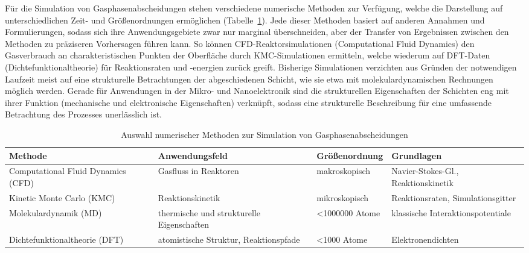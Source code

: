 Für die Simulation von Gasphasenabscheidungen stehen verschiedene numerische Methoden zur Verfügung, welche die Darstellung auf unterschiedlichen Zeit- und Größenordnungen ermöglichen (Tabelle~\ref{tab:deposition-simulations}).
Jede dieser Methoden basiert auf anderen Annahmen und Formulierungen, sodass sich ihre Anwendungsgebiete zwar nur marginal überschneiden, aber der Transfer von Ergebnissen zwischen den Methoden zu präziseren Vorhersagen führen kann.
So können CFD-Reaktorsimulationen (Computational Fluid Dynamics) den Gasverbrauch an charakteristischen Punkten der Oberfläche durch KMC-Simulationen ermitteln, welche wiederum auf DFT-Daten (Dichtefunktionaltheorie) für Reaktionsraten und -energien zurück greift.
Bisherige Simulationen verzichten aus Gründen der notwendigen Laufzeit meist auf eine strukturelle Betrachtungen der abgeschiedenen Schicht, wie sie etwa mit molekulardynamischen Rechnungen möglich werden.
Gerade für Anwendungen in der Mikro- und Nanoelektronik sind die strukturellen Eigenschaften der Schichten eng mit ihrer Funktion (mechanische\cite{chasiotis_mechanical_2003,cammarata_nanoindentation_1990} und elektronische Eigenschaften\cite{aspnes_optical_1982,steudel_influence_2004}) verknüpft, sodass eine strukturelle Beschreibung für eine umfassende Betrachtung des Prozesses unerlässlich ist.

\begin{table}[hb]
  \oddrowcolors
  \caption{Auswahl numerischer Methoden zur Simulation von Gasphasenabscheidungen}
  \label{tab:deposition-simulations}
  \begin{tabularx}{\textwidth}{|XXlX|}
    \hline
    \textbf{Methode}                   & \textbf{Anwendungsfeld}                   & \textbf{Größenordnung} & \textbf{Grundlagen}                 \\
    \hline
    Computational Fluid Dynamics (CFD) & Gasfluss in Reaktoren                     & makroskopisch          & Navier-Stokes-Gl., Reaktionskinetik \\
    Kinetic Monte Carlo (KMC)          & Reaktionskinetik                          & mikroskopisch          & Reaktionsraten, Simulationsgitter   \\
    Molekular\-dynamik (MD)            & thermische und strukturelle Eigenschaften & \num{<1000000} Atome   & klassische Interaktionspotentiale   \\
    Dichte\-funktional\-theorie (DFT)  & atomistische Struktur, Reaktionspfade     & \num{<1000} Atome      & Elektronendichten                   \\
    \hline
  \end{tabularx}
\end{table}
